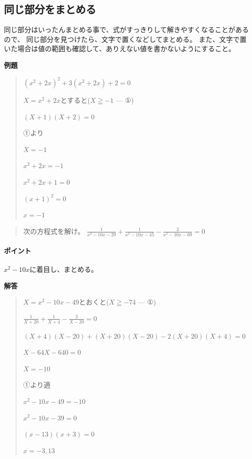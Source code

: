 \documentclass[uplatex,fleqn]{jsbook}
\begin{document}
\subsection{同じ部分をまとめる}
同じ部分はいったんまとめる事で、式がすっきりして解きやすくなることがあるので、
同じ部分を見つけたら、文字で置くなどしてまとめる。
また、文字で置いた場合は値の範囲も確認して、ありえない値を書かないようにすること。

\vspace{15pt} {\large \textbf{例題}}
\begin{quote}
    $\left(x^2+2x\right)^2+3\left(x^2+2x\right)+2=0$

    $X=x^2+2x$とすると($X\geqq-1$ --- ①)

    $\left(X+1\right)\left(X+2\right)=0$

    ①より

    $X=-1$

    $x^2+2x=-1$

    $x^2+2x+1=0$

    $\left(x+1\right)^2=0$

    $x=-1$
\end{quote}

\begin{quote}
    次の方程式を解け。
    $\displaystyle \frac{1}{x^2-10x-29}+\frac{1}{x^2-10x-45}-\frac{2}{x^2-10x-69}=0$
\end{quote}

\paragraph{ポイント}$x^2-10x$に着目し、まとめる。

\vspace{15pt} {\large \textbf{解答}}
\begin{quote}
    $X=x^2-10x-49$とおくと($X\geqq-74$ --- ①)

    $\displaystyle \frac{1}{X+20}+\frac{1}{X+4}-\frac{2}{X-20}=0$

    $\left(X+4\right)\left(X-20\right)+\left(X+20\right)\left(X-20\right)-2\left(X+20\right)\left(X+4\right)=0$

    $X-64X-640=0$

    $X=-10$

    ①より適

    $x^2-10x-49=-10$

    $x^2-10x-39=0$

    $\left(x-13\right)\left(x+3\right)=0$

    $x=-3,13$
\end{quote}
\end{document}
